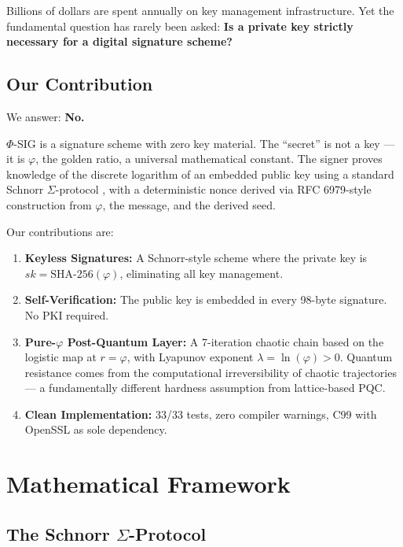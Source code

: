 \documentclass{article}
\begin{document}
Billions of dollars are spent annually on key management infrastructure. Yet the fundamental question has rarely been asked: \textbf{Is a private key strictly necessary for a digital signature scheme?}

\subsection{Our Contribution}

We answer: \textbf{No.}

$\Phi$-SIG is a signature scheme with zero key material. The ``secret'' is not a key — it is $\varphi$, the golden ratio, a universal mathematical constant. The signer proves knowledge of the discrete logarithm of an embedded public key using a standard Schnorr $\Sigma$-protocol \cite{schnorr1991}, with a deterministic nonce derived via RFC 6979-style construction \cite{rfc6979} from $\varphi$, the message, and the derived seed.

Our contributions are:
\begin{enumerate}
    \item \textbf{Keyless Signatures:} A Schnorr-style scheme where the private key is $sk = \text{SHA-256}(\varphi)$, eliminating all key management.
    \item \textbf{Self-Verification:} The public key is embedded in every 98-byte signature. No PKI required.
    \item \textbf{Pure-$\varphi$ Post-Quantum Layer:} A 7-iteration chaotic chain based on the logistic map at $r = \varphi$, with Lyapunov exponent $\lambda = \ln(\varphi) > 0$. Quantum resistance comes from the computational irreversibility of chaotic trajectories — a fundamentally different hardness assumption from lattice-based PQC.
    \item \textbf{Clean Implementation:} 33/33 tests, zero compiler warnings, C99 with OpenSSL as sole dependency.
\end{enumerate}

\section{Mathematical Framework}

\subsection{The Schnorr $\Sigma$-Protocol}
\end{document}
